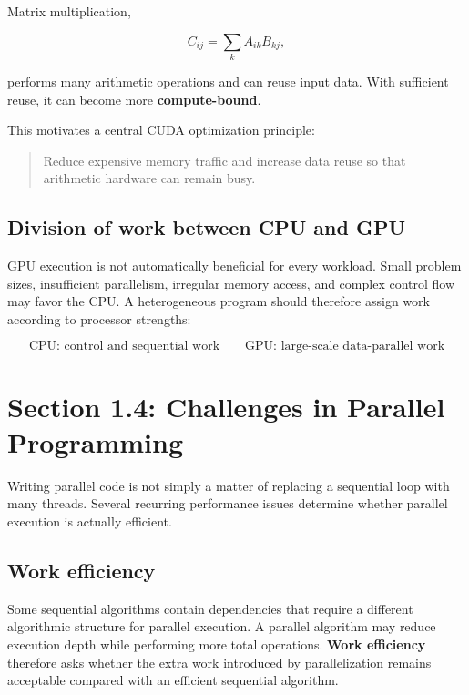 \documentclass[11pt,a4paper]{article}
\begin{document}
Matrix multiplication,

\begin{equation}
C_{ij}=\sum_k A_{ik}B_{kj},
\end{equation}

performs many arithmetic operations and can reuse input data. With sufficient reuse, it can become more \textbf{compute-bound}.

This motivates a central CUDA optimization principle:

\begin{quote}
Reduce expensive memory traffic and increase data reuse so that arithmetic hardware can remain busy.
\end{quote}

\subsection{Division of work between CPU and GPU}

GPU execution is not automatically beneficial for every workload. Small problem sizes, insufficient parallelism, irregular memory access, and complex control flow may favor the CPU. A heterogeneous program should therefore assign work according to processor strengths:

\[
\boxed{
\text{CPU: control and sequential work}
\qquad
\text{GPU: large-scale data-parallel work}
}
\]

\section{Section 1.4: Challenges in Parallel Programming}

Writing parallel code is not simply a matter of replacing a sequential loop with many threads. Several recurring performance issues determine whether parallel execution is actually efficient.

\subsection{Work efficiency}

Some sequential algorithms contain dependencies that require a different algorithmic structure for parallel execution. A parallel algorithm may reduce execution depth while performing more total operations. \textbf{Work efficiency} therefore asks whether the extra work introduced by parallelization remains acceptable compared with an efficient sequential algorithm.
\end{document}

